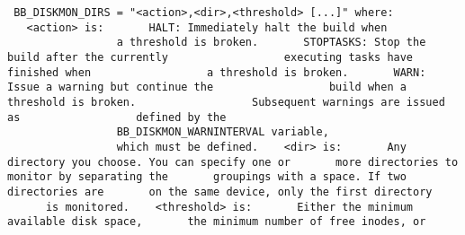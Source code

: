 {\begin{codeblock}
\footnotesize
\texttt{\noindent
BB\_DISKMON\_DIRS = "<action>,<dir>,<threshold> [...]" \linebreak
\linebreak
where: \linebreak
\linebreak
${}$\ \ \ <action> is: \linebreak
${}$\ \ \ \ \ \ HALT:      Immediately halt the build when \linebreak
${}$\ \ \ \ \ \ \ \ \ \ \ \ \ \ \ \ \ a threshold is broken. \linebreak
${}$\ \ \ \ \ \ STOPTASKS: Stop the build after the currently \linebreak
${}$\ \ \ \ \ \ \ \ \ \ \ \ \ \ \ \ \ executing tasks have finished when \linebreak
${}$\ \ \ \ \ \ \ \ \ \ \ \ \ \ \ \ \ a threshold is broken. \linebreak
${}$\ \ \ \ \ \ WARN:      Issue a warning but continue the \linebreak
${}$\ \ \ \ \ \ \ \ \ \ \ \ \ \ \ \ \ build when a threshold is broken. \linebreak
${}$\ \ \ \ \ \ \ \ \ \ \ \ \ \ \ \ \ Subsequent warnings are issued as \linebreak
${}$\ \ \ \ \ \ \ \ \ \ \ \ \ \ \ \ \ defined by the \linebreak
${}$\ \ \ \ \ \ \ \ \ \ \ \ \ \ \ \ \ BB\_DISKMON\_WARNINTERVAL variable, \linebreak
${}$\ \ \ \ \ \ \ \ \ \ \ \ \ \ \ \ \ which must be defined. \linebreak
\linebreak
${}$\ \ \ <dir> is: \linebreak
${}$\ \ \ \ \ \ Any directory you choose. You can specify one or \linebreak
${}$\ \ \ \ \ \ more directories to monitor by separating the \linebreak
${}$\ \ \ \ \ \ groupings with a space.  If two directories are \linebreak
${}$\ \ \ \ \ \ on the same device, only the first directory \linebreak
${}$\ \ \ \ \ \ is monitored. \linebreak
\linebreak
${}$\ \ \ <threshold> is: \linebreak
${}$\ \ \ \ \ \ Either the minimum available disk space, \linebreak
${}$\ \ \ \ \ \ the minimum number of free inodes, or \linebreak
}
\end{codeblock}}
